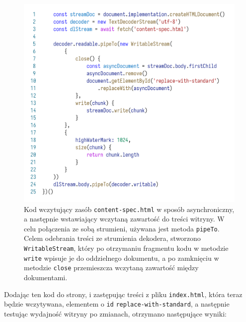 \documentclass[licencjacka]{pracadypl}
\begin{document}
\begin{figure}[H]
  \centering
  \includegraphics[width=\linewidth]{images/code-js-async-streaming.png}
  \caption{Kod wczytujący zasób \texttt{content-spec.html} w sposób asynchroniczny, a następnie wstawiający wczytaną zawartość do treści witryny. W celu połączenia ze sobą strumieni, używana jest metoda \texttt{pipeTo}. Celem odebrania treści ze strumienia dekodera, stworzono \texttt{WritableStream}, który po otrzymaniu fragmentu kodu w metodzie \texttt{write} wpisuje je do oddzielnego dokumentu, a po zamknięciu w metodzie \texttt{close} przemieszcza wczytaną zawartość między dokumentami.}
  \label{fig:code-js-async-streaming}
\end{figure}

Dodając ten kod do strony, i zastępując treści z pliku \texttt{index.html}, która teraz będzie wczytywana, elementem o \texttt{id} \texttt{replace-with-standard}, a następnie testując wydajność witryny po zmianach, otrzymano następujące wyniki:
\end{document}
